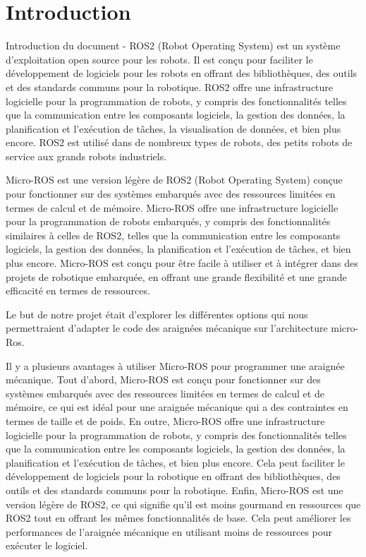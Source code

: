 	\chapter{Introduction}

Introduction du document - 	
ROS2 (Robot Operating System) est un système d'exploitation open source pour les robots. 
Il est conçu pour faciliter le développement de logiciels pour les robots en offrant des bibliothèques, 
des outils et des standards communs pour la robotique. ROS2 offre une infrastructure logicielle pour la programmation de robots, 
y compris des fonctionnalités telles que la communication entre les composants logiciels, la gestion des données, 
la planification et l'exécution de tâches, la visualisation de données, et bien plus encore. 
ROS2 est utilisé dans de nombreux types de robots, des petits robots de service aux grands robots industriels. 
\linebreak

Micro-ROS est une version légère de ROS2 (Robot Operating System) conçue pour fonctionner sur des systèmes embarqués avec 
des ressources limitées en termes de calcul et de mémoire. Micro-ROS offre une infrastructure logicielle pour la programmation 
de robots embarqués, y compris des fonctionnalités similaires à celles de ROS2, telles que la communication entre les composants 
logiciels, la gestion des données, la planification et l'exécution de tâches, et bien plus encore. 
Micro-ROS est conçu pour être facile à utiliser et à intégrer dans des projets de robotique embarquée, en offrant une grande 
flexibilité et une grande efficacité en termes de ressources. 
\linebreak

Le but de notre projet était d’explorer les différentes options qui nous permettraient d’adapter le code des araignées 
mécanique sur l’architecture micro-Ros. 
\linebreak

Il y a plusieurs avantages à utiliser Micro-ROS pour programmer une araignée mécanique. 
Tout d'abord, Micro-ROS est conçu pour fonctionner sur des systèmes embarqués avec des ressources limitées en termes 
de calcul et de mémoire, ce qui est idéal pour une araignée mécanique qui a des contraintes en termes de taille et de poids. 
En outre, Micro-ROS offre une infrastructure logicielle pour la programmation de robots, y compris des fonctionnalités telles 
que la communication entre les composants logiciels, la gestion des données, la planification et l'exécution de tâches, 
et bien plus encore. Cela peut faciliter le développement de logiciels pour la robotique en offrant des bibliothèques, des outils 
et des standards communs pour la robotique. 
Enfin, Micro-ROS est une version légère de ROS2, ce qui signifie qu'il est moins gourmand en ressources que ROS2 tout en offrant 
les mêmes fonctionnalités de base. Cela peut améliorer les performances de l'araignée mécanique en utilisant moins de ressources 
pour exécuter le logiciel. 
\linebreak

